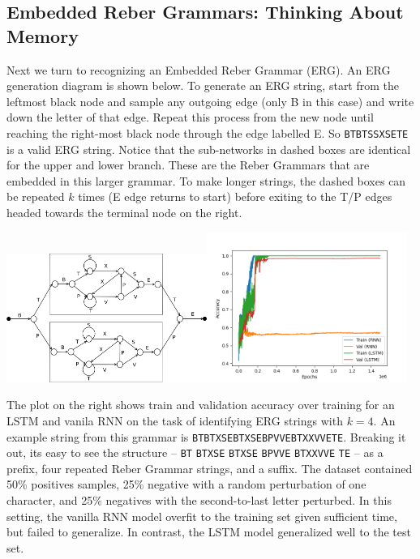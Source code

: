 \documentclass[a4paper,10pt]{article}
\begin{document}
\subsection{Embedded Reber Grammars: Thinking About Memory}
Next we turn to recognizing an Embedded Reber Grammar (ERG). An ERG generation diagram is shown below. To generate an ERG string, start from the leftmost black node and sample any outgoing edge (only B in this case) and write down the letter of that edge. Repeat this process from the new node until reaching the right-most black node through the edge labelled E. So \texttt{BTBTSSXSETE} is a valid ERG string. Notice that the sub-networks in dashed boxes are identical for the upper and lower branch. These are the Reber Grammars that are embedded in this larger grammar. To make longer strings, the dashed boxes can be repeated $k$ times (E edge returns to start) before exiting to the T/P edges headed towards the terminal node on the right.

\begin{center}
\includegraphics[width=0.49\textwidth]{figures/EmbeddedReber.png}\includegraphics[width=0.49\textwidth]{figures/reber_generalization.png}
\end{center}

\noindent The plot on the right shows train and validation accuracy over training for an LSTM and vanila RNN on the task of identifying ERG strings with $k=4$. An example string from this grammar is \texttt{BTBTXSEBTXSEBPVVEBTXXVVETE}. Breaking it out, its easy to see the structure -- \texttt{BT} \texttt{BTXSE} \texttt{BTXSE} \texttt{BPVVE}
\texttt{BTXXVVE}
\texttt{TE} -- as a prefix, four repeated Reber Grammar strings, and a suffix. The dataset contained 50\% positives samples, 25\% negative with a random perturbation of one character, and 25\% negatives with the second-to-last letter perturbed. In this setting, the vanilla RNN model overfit to the training set given sufficient time, but failed to generalize. In contrast, the LSTM model generalized well to the test set.
\end{document}
